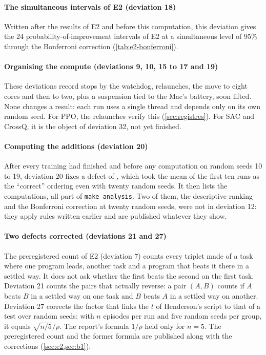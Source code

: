 \paragraph{The simultaneous intervals of E2 (deviation 18)} Written after the
results of E2 and before this computation, this deviation gives the 24 probability-of-improvement
intervals of E2 at a simultaneous level of 95\% through the Bonferroni correction
(\cref{tab:e2-bonferroni}).

\paragraph{Organising the compute (deviations 9, 10, 15 to 17 and 19)} These deviations record stops
by the watchdog, relaunches, the move to eight cores and then to two, plus a suspension tied to the
Mac's battery, soon lifted. None changes a result: each run uses a single thread and
depends only on its own random seed. For PPO, the relaunches verify this (\cref{sec:registres}). For
SAC and CrossQ, it is the object of deviation 32, not yet finished.

\paragraph{Computing the additions (deviation 20)} After every training had
finished and before any computation on random seeds 10 to 19, deviation 20 fixes a defect of
, which took the mean of the first ten runs as the \enquote{correct} ordering
even with twenty random seeds. It then lists the computations, all part of \texttt{make analysis}. Two
of them, the descriptive ranking and the Bonferroni correction at twenty random seeds, were not in
deviation 12: they apply rules written earlier and are published whatever they show.

\paragraph{Two defects corrected (deviations 21 and 27)} The preregistered count of E2 (deviation 7)
counts every triplet made of a task where one program leads, another task and a program that beats
it there in a settled way. It does not ask whether the first beats the second on the first task.
Deviation 21 counts the pairs that actually reverse: a pair $(A, B)$ counts if $A$ beats $B$ in a
settled way on one task and $B$ beats $A$ in a settled way on another. Deviation 27 corrects the
factor that links the $t$ of Henderson's script to that of a test over random seeds: with $n$
episodes per run and five random seeds per group, it equals $\sqrt{n/5}/\rho$. The report's formula
$1/\rho$ held only for $n = 5$. The preregistered count and the former formula are published along
with the corrections (\cref{sec:e2,sec:b1}).

